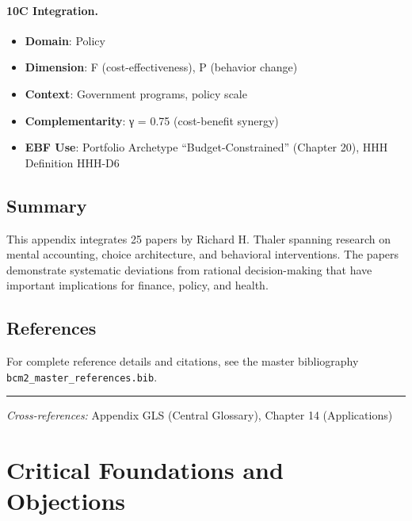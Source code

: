 \paragraph{10C Integration.}
\begin{itemize}[nosep]
  \item \textbf{Domain}: Policy
  \item \textbf{Dimension}: F (cost-effectiveness), P (behavior change)
  \item \textbf{Context}: Government programs, policy scale
  \item \textbf{Complementarity}: γ = 0.75 (cost-benefit synergy)
  \item \textbf{EBF Use}: Portfolio Archetype ``Budget-Constrained'' (Chapter 20), HHH Definition HHH-D6
\end{itemize}

\subsection{Summary}

This appendix integrates 25 papers by Richard H. Thaler
spanning research on mental accounting, choice architecture, and behavioral
interventions. The papers demonstrate systematic deviations from rational
decision-making that have important implications for finance, policy, and health.

\subsection{References}

For complete reference details and citations, see the master bibliography
\texttt{bcm2\_master\_references.bib}.

\vspace{1em}
\hrule
\vspace{0.5em}

\noindent\textit{Cross-references:}
Appendix GLS (Central Glossary), Chapter 14 (Applications)



\section{Critical Foundations and Objections}
\label{sec:thl-foundations}

